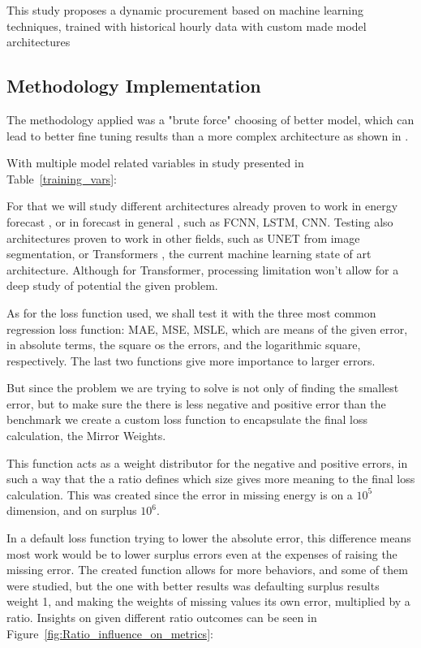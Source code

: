 

This study proposes a dynamic procurement based on machine learning techniques, trained with historical hourly data with custom made model architectures

\subsection{Methodology Implementation}

The methodology applied was a "brute force" choosing of better model, which can lead to better fine tuning results than a more complex architecture as shown in \cite{Liu2022}.\par
With multiple model related variables in study presented in Table~\ref{training_vars}:\par



For that we will study different architectures already proven to work in energy forecast \cite{Costa2022}, or in forecast in general \cite{Hewamalage2021}, such as \gls{FCNN}, \gls{LSTM}, \gls{CNN}. Testing also architectures proven to work in other fields, such as UNET \cite{Shelhamer2014} from image segmentation, or Transformers \cite{Vaswani2017}, the current machine learning state of art architecture. Although for Transformer, processing limitation won't allow for a deep study of potential the given problem.\par
As for the loss function used, we shall test it with the three most common regression loss function: \gls{MAE}, \gls{MSE}, \gls{MSLE}, which are means of the given error, in absolute terms, the square os the errors, and the logarithmic square, respectively. The last two functions give more importance to larger errors.\par
But since the problem we are trying to solve is not only of finding the smallest error, but to make sure the there is less negative and positive error than the benchmark we create a custom loss function to encapsulate the final loss calculation, the Mirror Weights. %

This function acts as a weight distributor for the negative and positive errors, in such a way that the a ratio defines which size gives more meaning to the final loss calculation. This was created since the error in missing energy is on a $10^{5}$ dimension, and on surplus $10^{6}$.\par
In a default loss function trying to lower the absolute error, this difference means most work would be to lower surplus errors even at the expenses of raising the missing error. The created function allows for more behaviors, and some of them were studied, but the one with better results was defaulting surplus results weight 1, and making the weights of missing values its own error, multiplied by a ratio. Insights on given different ratio outcomes can be seen in Figure~\ref{fig:Ratio_influence_on_metrics}:\par


